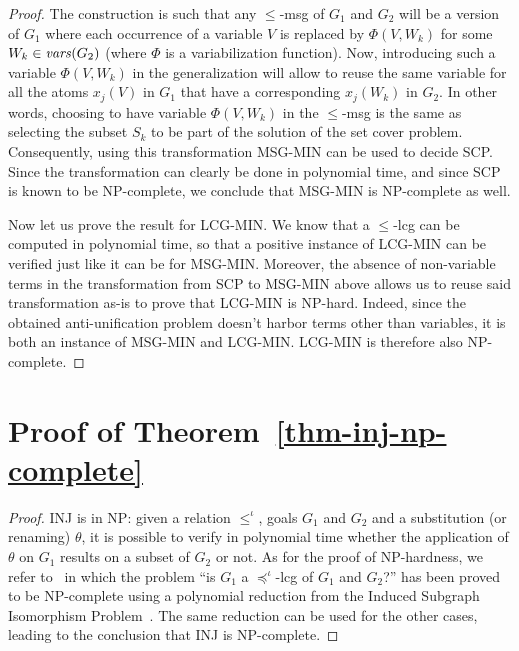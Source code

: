 \begin{proof}
	The construction is such that any $\leqslant$-msg of $G_1$ and $G_2$ will be a version of $G_1$ where each occurrence of a variable $V$ is replaced by $\Phi(V, W_k)$ for some $W_k\in\mathit{vars}(G_2)$ (where $\Phi$ is a variabilization function). Now, introducing such a variable $\Phi(V, W_k)$ in the generalization will allow to reuse the same variable for all the atoms $x_j(V)$ in $G_1$ that have a corresponding $x_j(W_k)$ in $G_2$. In other words, choosing to have variable $\Phi(V,W_k)$ in the $\leqslant$-msg is the same as selecting the subset $S_k$ to be part of the solution of the set cover problem. Consequently, using this transformation MSG-MIN can be used to decide SCP. Since the transformation can clearly be done in polynomial time, and since SCP is known to be NP-complete, we conclude that MSG-MIN is NP-complete as well.
	
	Now let us prove the result for LCG-MIN. We know that a $\leqslant$-lcg can be computed in polynomial time, so that a positive instance of LCG-MIN can be verified just like it can be for MSG-MIN. Moreover, the absence of non-variable terms in the transformation from SCP to MSG-MIN above allows us to reuse said transformation as-is to prove that LCG-MIN is NP-hard. Indeed, since the obtained anti-unification problem doesn't harbor terms other than variables, it is both an instance of MSG-MIN and LCG-MIN. LCG-MIN is therefore also NP-complete.
\end{proof}
	
	\section{Proof of Theorem~\ref{thm-inj-np-complete}}
\begin{proof}
	INJ is in NP: given a relation $\leqslant^\iota$, goals $G_1$ and $G_2$ and a substitution (or renaming) $\theta$, it is possible to verify in polynomial time whether the application of $\theta$ on $G_1$ results on a subset of $G_2$ or not.
	As for the proof of NP-hardness, we refer to~\cite{gen} in which the problem ``is $G_1$ a $\preceq^\iota$-lcg of $G_1$ and $G_2$?'' has been proved to be NP-complete using a polynomial reduction from the Induced Subgraph Isomorphism Problem~\cite{SYSLO198291}. The same reduction can be used for the other cases, leading to the conclusion that INJ is NP-complete.
\end{proof}
	
